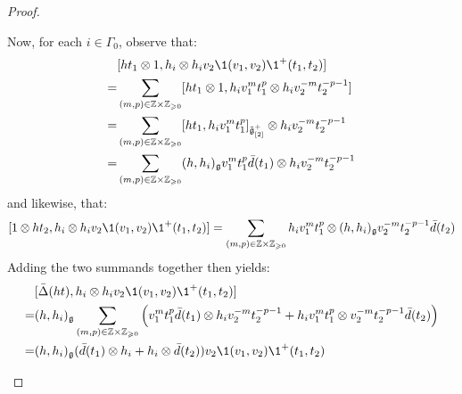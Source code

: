 \begin{proof}
\begin{enumerate}
\begin{enumerate}
                        Now, for each $i \in \Gamma_0$, observe that:
                            $$
                                \begin{aligned}
                                    & [h t_1 \tensor 1, h_i \tensor h_i v_2\1(v_1, v_2) \1^+(t_1, t_2)]
                                    \\
                                    = & \sum_{(m, p) \in \Z \x \Z_{\geq 0}} [ht_1 \tensor 1, h_i v_1^m t_1^p \tensor h_i v_2^{-m} t_2^{-p - 1}]
                                    \\
                                    = & \sum_{(m, p) \in \Z \x \Z_{\geq 0}} [ht_1, h_i v_1^m t_1^p]_{\tilde{\g}_{[2]}^+} \tensor h_i v_2^{-m} t_2^{-p - 1}
                                    \\
                                    = & \sum_{(m, p) \in \Z \x \Z_{\geq 0}} (h, h_i)_{\g} v_1^m t_1^p \bar{d}(t_1) \tensor h_i v_2^{-m} t_2^{-p - 1}
                                \end{aligned}
                            $$
                        and likewise, that:
                            $$[1 \tensor h t_2, h_i \tensor h_i v_2\1(v_1, v_2) \1^+(t_1, t_2)] = \sum_{(m, p) \in \Z \x \Z_{\geq 0}} h_i v_1^m t_1^p \tensor (h, h_i)_{\g} v_2^{-m} t_2^{-p - 1} \bar{d}(t_2)$$
                        Adding the two summands together then yields:
                            $$
                                \begin{aligned}
                                    & [\bar{\Delta}(ht), h_i \tensor h_i v_2\1(v_1, v_2) \1^+(t_1, t_2)]
                                    \\
                                    = & (h, h_i)_{\g} \sum_{(m, p) \in \Z \x \Z_{\geq 0}} \left( v_1^m t_1^p \bar{d}(t_1) \tensor h_i v_2^{-m} t_2^{-p - 1} + h_i v_1^m t_1^p \tensor v_2^{-m} t_2^{-p - 1} \bar{d}(t_2) \right)
                                    \\
                                    = & (h, h_i)_{\g} ( \bar{d}(t_1) \tensor h_i + h_i \tensor \bar{d}(t_2) ) v_2\1(v_1, v_2) \1^+(t_1, t_2)
                                \end{aligned}
                            $$
                        

\end{enumerate}
\end{enumerate}
\end{proof}
